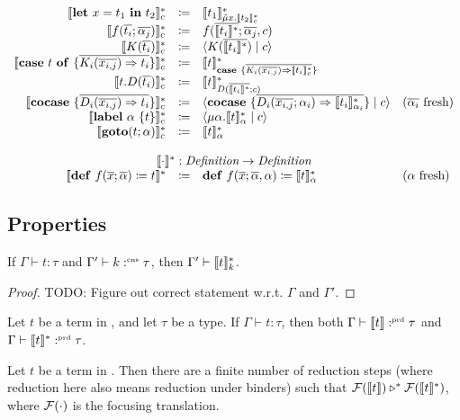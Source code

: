\[\begin{array}{rcll}
    \translatestar{\letin{x}{t_1}{t_2}}{c} & \coloneq & \translatestar{t_1}{\tilde{\mu}x.\translatestar{t_2}{c}} & \\
    \translatestar{f(\overline{t_i}; \overline{\alpha_j})}{c} & \coloneq & f(\overline{\translatestar{t_i}{}}; \overline{\alpha_j}, c) & \\
    \translatestar{K(\overline{t_i})}{c} & \coloneq & \cut{K(\overline{\translatestar{t_i}{}})}{c} & \\
    \translatestar{\caseof{t}{\overline{K_i(\overline{x_{i,j}}) \Rightarrow t_i}}}{c} & \coloneq & \translatestar{t}{\case{\overline{K_i(\overline{x_{i,j}}) \Rightarrow \translatestar{t_i}{c}}}} & \\
    \translatestar{t.D(\overline{t_i})}{c} & \coloneq & \translatestar{t}{D(\overline{\translatestar{t_i}{}}; c)} & \\
    \translatestar{\cocase{\overline{D_i(\overline{x_{i,j}}) \Rightarrow t_i}}}{c} & \coloneq & \cut{\cocase{\overline{D_i(\overline{x_{i,j}}; \alpha_i) \Rightarrow \translatestar{t_i}{\alpha_i}}}}{c} & \fresh{\overline{\alpha_i}} \\
    \translatestar{\lab{\alpha}{t}}{c} & \coloneq & \cut{\mu \alpha.\translatestar{t}{\alpha}}{c} & \\
    \translatestar{\goto{t}{\alpha}}{c} & \coloneq & \translatestar{t}{\alpha} & \\
    \\
    \multicolumn{4}{c}{\translatestar{\cdot}{} : \emph{Definition} \rightarrow \emph{Definition}}\\
    \translatestar{\defi{f(\overline{x}; \overline{\alpha})}{t}}{} & \coloneq & \defi{f(\overline{x}; \overline{\alpha}, \alpha)}{\translatestar{t}{\alpha}} & \fresh{\alpha}
  \end{array}
\]

\subsection{Properties}
\label{subsec:translation:properties}

\begin{lemma}
  If $\Gamma \vdash t : \tau$ and $\Gamma' \vdash k :^{\text{\tiny cns}} \tau$, then $\Gamma' \vdash \llbracket t \rrbracket_{k}^{\ast}$.
\end{lemma}
\begin{proof}
  TODO: Figure out correct statement w.r.t. $\Gamma$ and $\Gamma'$.
\end{proof}

\begin{theorem}
  Let $t$ be a term in \surfacelang, and let $\tau$ be a type.
  If $\Gamma \vdash t: \tau$, then both $\Gamma \vdash \llbracket t \rrbracket :^{\text{\tiny prd}} \tau$ and $\Gamma \vdash \llbracket t \rrbracket_{}^{\ast} :^{\text{\tiny prd}} \tau$.
\end{theorem}

\begin{theorem}[Correctness]
  Let $t$ be a term in \surfacelang. Then there are a finite number of reduction steps (where reduction here also means reduction under binders) such that $\mathcal{F}(\llbracket t \rrbracket) \triangleright^{\ast} \mathcal{F}(\llbracket t \rrbracket_{}^{\ast})$, where $\mathcal{F}(\cdot)$ is the focusing translation.
\end{theorem}
